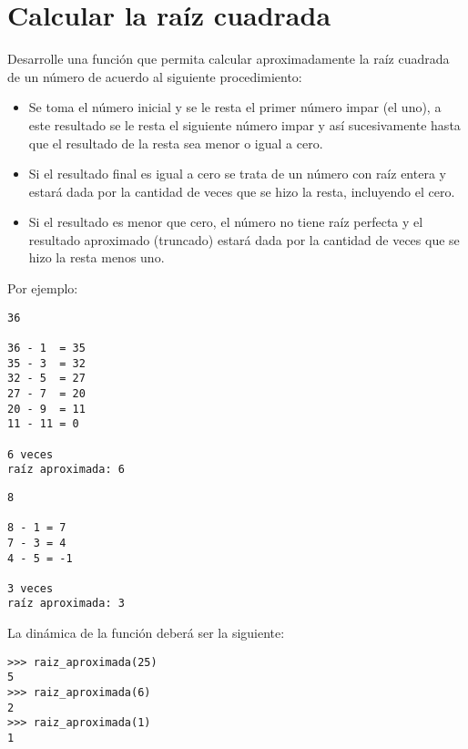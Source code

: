 \section{Calcular la raíz cuadrada}

Desarrolle una función que permita calcular aproximadamente la raíz
cuadrada de un número de acuerdo al siguiente procedimiento:

\begin{itemize}
\item
  Se toma el número inicial y se le resta el primer número impar (el
  uno), a este resultado se le resta el siguiente número impar y así
  sucesivamente hasta que el resultado de la resta sea menor o igual a
  cero.
\item
  Si el resultado final es igual a cero se trata de un número con raíz
  entera y estará dada por la cantidad de veces que se hizo la resta,
  incluyendo el cero.
\item
  Si el resultado es menor que cero, el número no tiene raíz perfecta y
  el resultado aproximado (truncado) estará dada por la cantidad de
  veces que se hizo la resta menos uno.
\end{itemize}

Por ejemplo:

\begin{lstlisting}
36

36 - 1  = 35
35 - 3  = 32
32 - 5  = 27
27 - 7  = 20
20 - 9  = 11
11 - 11 = 0

6 veces
raíz aproximada: 6
\end{lstlisting}

\begin{lstlisting}
8

8 - 1 = 7
7 - 3 = 4
4 - 5 = -1

3 veces
raíz aproximada: 3
\end{lstlisting}

La dinámica de la función deberá ser la siguiente:

\begin{lstlisting}
>>> raiz_aproximada(25)
5
>>> raiz_aproximada(6)
2
>>> raiz_aproximada(1)
1
\end{lstlisting}

